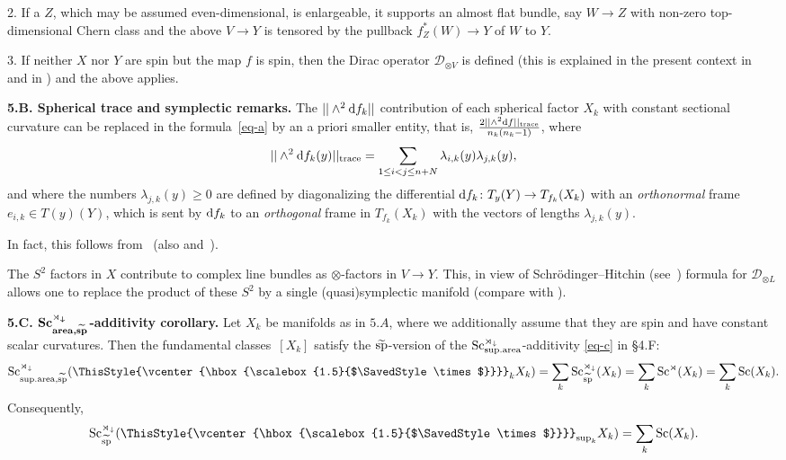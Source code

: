 \documentclass[10pt,a4paper]{amsart}
\numberwithin{equation}{section}
\newcommand\bigtimes{\mathbin{\ThisStyle{\vcenter{\hbox{%
\scalebox{1.5}{$\SavedStyle\times$}}}}}}
\begin{document}
2. If a $Z$, which may be assumed even-dimensional, is enlargeable,
it supports an almost flat bundle, say $W \to Z$ with non-zero top-dimensional Chern class and the above $V\to Y$ is tensored by the
pullback $f_Z^\ast(W)\to Y$ of $W$ to $Y$.

3. If neither $X$ nor $Y$ are spin but the map $f$ is spin, then
the Dirac operator $\mathcal D_{\otimes V}$ is defined (this is explained in the present context in~\cite{Mi1995} and in \cite{GS2002}) and the above applies.


\textbf{5.B. Spherical trace and symplectic remarks.} The $ ||\wedge^2{\rm d}f_k||$ contribution of each spherical factor $X_k$ with constant sectional curvature can be replaced
 in the formula~\eqref{eq-a} by an a priori smaller
entity, that is, $ 2||\wedge^2{\rm d}f||_{\rm trace}\over n_k(n_k-1)$,
where
\[
 ||\wedge^2{\rm d}f_k(y)||_{\rm trace}=\sum_{1\leq i<j\leq n+N} \lambda_{i,k}(y) \lambda_{j,k}(y),
 \]
and where the numbers $\lambda_{j,k}(y)\geq 0$ are defined by diagonalizing the
differential ${\rm d}f_k\colon T_y(Y)\to T_{f_k}(X_k)$
with an {\it orthonormal} frame $e_{i,k}\in T(y)(Y)$,
which is sent by ${\rm d}f_k$ to an {\it orthogonal} frame in $T_{f_k}(X_k)$ with the vectors of
lengths $\lambda_{j,k}(y)$.

In fact, this follows from~\cite[formula~(4.6)]{Ll1998} (also \cite{Li2010} and~\cite[\S3.4]{Gr2021}).

The $S^2$ factors in $X$ contribute to complex line bundles as
$\otimes$-factors in $ V\to Y$.
This, in view of Schr\"odinger--Hitchin (see~\cite{Hi1974}) formula for $\mathcal D_{\otimes L}$ allows one to replace the product of these
$S^2$ by a single (quasi)symplectic manifold (compare with \cite[\S2.7 and \S3.4.4(4)]{Gr2021}).

\textbf{5.C. $\boldsymbol{\operatorname{Sc}_{{\rm area},\widetilde {\rm sp}}^{\rtimes_\downarrow}}$-additivity corollary.}
Let $X_k$ be manifolds as in $5.A$, where we additionally assume that they are spin and have constant scalar curvatures.
Then the fundamental classes~$[X_k]$ satisfy the $\widetilde {\rm sp}$-version of the
$\operatorname{Sc}_{{\rm sup.area}}^{\rtimes_\downarrow}$-additivity \eqref{eq-c} in \S4.F:
\[
\operatorname{Sc}_{{\rm sup.area}, \widetilde{\rm sp}}^{\rtimes_\downarrow}( \bigtimes_k X_k)=
\sum_k\operatorname{Sc}_{ \widetilde{\rm sp}}^{\rtimes_\downarrow}(X_k)=
\sum_k\operatorname{Sc}^{\rtimes}(X_k)=\sum_k\operatorname{Sc}(X_k).
\]
Consequently,
\[
\operatorname{Sc}_{\widetilde{\rm sp}}^{\rtimes_\downarrow}( \bigtimes_{\sup_k} X_k)
=\sum_k\operatorname{Sc}(X_k).
\]
\end{document}
